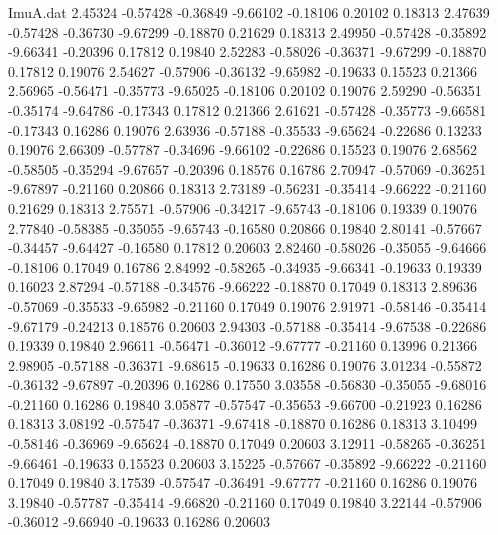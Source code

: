 \begin{filecontents}{ImuA.dat}
   2.45324   -0.57428   -0.36849   -9.66102   -0.18106    0.20102    0.18313
   2.47639   -0.57428   -0.36730   -9.67299   -0.18870    0.21629    0.18313
   2.49950   -0.57428   -0.35892   -9.66341   -0.20396    0.17812    0.19840
   2.52283   -0.58026   -0.36371   -9.67299   -0.18870    0.17812    0.19076
   2.54627   -0.57906   -0.36132   -9.65982   -0.19633    0.15523    0.21366
   2.56965   -0.56471   -0.35773   -9.65025   -0.18106    0.20102    0.19076
   2.59290   -0.56351   -0.35174   -9.64786   -0.17343    0.17812    0.21366
   2.61621   -0.57428   -0.35773   -9.66581   -0.17343    0.16286    0.19076
   2.63936   -0.57188   -0.35533   -9.65624   -0.22686    0.13233    0.19076
   2.66309   -0.57787   -0.34696   -9.66102   -0.22686    0.15523    0.19076
   2.68562   -0.58505   -0.35294   -9.67657   -0.20396    0.18576    0.16786
   2.70947   -0.57069   -0.36251   -9.67897   -0.21160    0.20866    0.18313
   2.73189   -0.56231   -0.35414   -9.66222   -0.21160    0.21629    0.18313
   2.75571   -0.57906   -0.34217   -9.65743   -0.18106    0.19339    0.19076
   2.77840   -0.58385   -0.35055   -9.65743   -0.16580    0.20866    0.19840
   2.80141   -0.57667   -0.34457   -9.64427   -0.16580    0.17812    0.20603
   2.82460   -0.58026   -0.35055   -9.64666   -0.18106    0.17049    0.16786
   2.84992   -0.58265   -0.34935   -9.66341   -0.19633    0.19339    0.16023
   2.87294   -0.57188   -0.34576   -9.66222   -0.18870    0.17049    0.18313
   2.89636   -0.57069   -0.35533   -9.65982   -0.21160    0.17049    0.19076
   2.91971   -0.58146   -0.35414   -9.67179   -0.24213    0.18576    0.20603
   2.94303   -0.57188   -0.35414   -9.67538   -0.22686    0.19339    0.19840
   2.96611   -0.56471   -0.36012   -9.67777   -0.21160    0.13996    0.21366
   2.98905   -0.57188   -0.36371   -9.68615   -0.19633    0.16286    0.19076
   3.01234   -0.55872   -0.36132   -9.67897   -0.20396    0.16286    0.17550
   3.03558   -0.56830   -0.35055   -9.68016   -0.21160    0.16286    0.19840
   3.05877   -0.57547   -0.35653   -9.66700   -0.21923    0.16286    0.18313
   3.08192   -0.57547   -0.36371   -9.67418   -0.18870    0.16286    0.18313
   3.10499   -0.58146   -0.36969   -9.65624   -0.18870    0.17049    0.20603
   3.12911   -0.58265   -0.36251   -9.66461   -0.19633    0.15523    0.20603
   3.15225   -0.57667   -0.35892   -9.66222   -0.21160    0.17049    0.19840
   3.17539   -0.57547   -0.36491   -9.67777   -0.21160    0.16286    0.19076
   3.19840   -0.57787   -0.35414   -9.66820   -0.21160    0.17049    0.19840
   3.22144   -0.57906   -0.36012   -9.66940   -0.19633    0.16286    0.20603

\end{filecontents}
